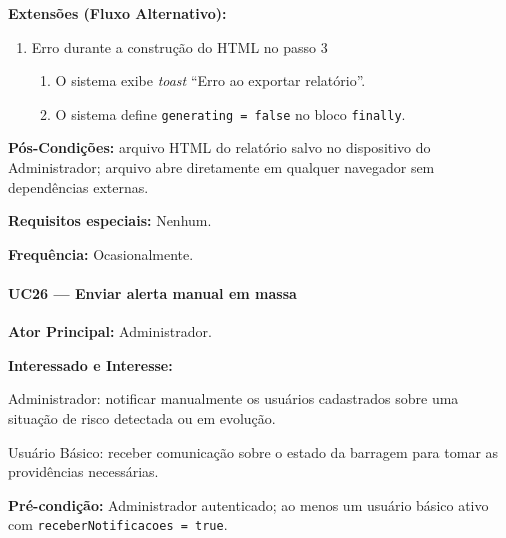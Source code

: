 \textbf{Extensões (Fluxo Alternativo):}

\begin{enumerate}
  \renewcommand{\theenumi}{3a}
  \renewcommand{\labelenumi}{\theenumi.}
  \item Erro durante a construção do HTML no passo 3
  \begin{enumerate}
  \item O sistema exibe \textit{toast}
        ``Erro ao exportar relatório''.
  \item O sistema define \texttt{generating = false}
        no bloco \texttt{finally}.
  \end{enumerate}
\end{enumerate}

\textbf{Pós-Condições:} arquivo HTML do relatório salvo
no dispositivo do Administrador; arquivo abre
diretamente em qualquer navegador sem dependências
externas.

\textbf{Requisitos especiais:} Nenhum.

\textbf{Frequência:} Ocasionalmente.

\paragraph{UC26 --- Enviar alerta manual em massa}\hfill\break

\textbf{Ator Principal:} Administrador.

\textbf{Interessado e Interesse:}

Administrador: notificar manualmente os usuários cadastrados
sobre uma situação de risco detectada ou em evolução.

Usuário Básico: receber comunicação sobre o estado da
barragem para tomar as providências necessárias.

\textbf{Pré-condição:} Administrador autenticado; ao menos
um usuário básico ativo com
\texttt{receberNotificacoes = true}.

